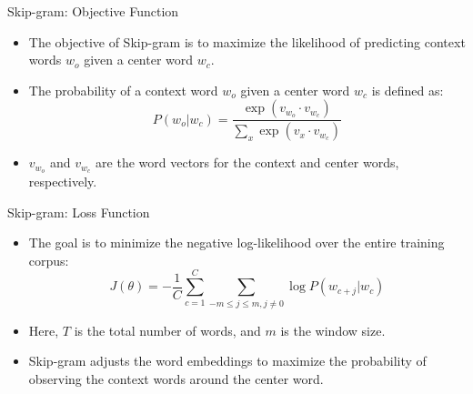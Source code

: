 \documentclass[serif, aspectratio=169]{beamer}
\begin{document}
\begin{frame}{Skip-gram: Objective Function}
    \begin{itemize}
        \item The objective of Skip-gram is to maximize the likelihood of predicting context words \(w_o\) given a center word \(w_c\).
        \item The probability of a context word \(w_o\) given a center word \(w_c\) is defined as:
        \[
        P(w_o | w_c) = \frac{\exp(v_{w_o} \cdot v_{w_c})}{\sum_x \exp(v_x \cdot v_{w_c})}
        \]
        \item \(v_{w_o}\) and \(v_{w_c}\) are the word vectors for the context and center words, respectively.
    \end{itemize}
\end{frame}

\begin{frame}{Skip-gram: Loss Function}
    \begin{itemize}
        \item The goal is to minimize the negative log-likelihood over the entire training corpus:
        \[
        J(\theta) = -\frac{1}{C} \sum_{c=1}^{C} \sum_{-m \leq j \leq m, j \neq 0} \log P(w_{c+j} | w_c)
        \]
        \item Here, \(T\) is the total number of words, and \(m\) is the window size.
        \item Skip-gram adjusts the word embeddings to maximize the probability of observing the context words around the center word.
    \end{itemize}
\end{frame}


\end{document}
